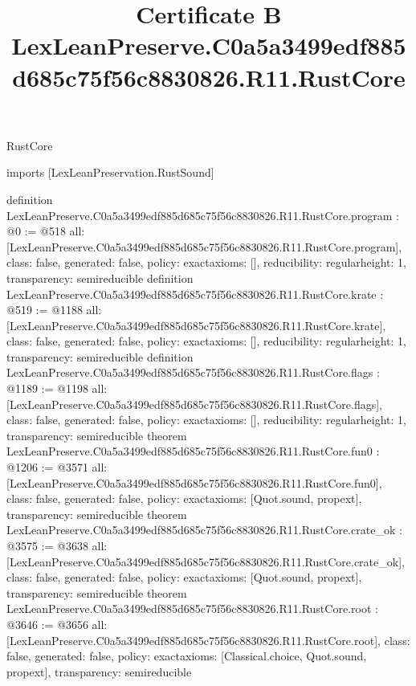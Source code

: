 \begin{lexlean}{RustCore}
\title{Certificate B LexLeanPreserve.C0a5a3499edf885d685c75f56c8830826.R11.RustCore}
\begin{coremodule}
imports [LexLeanPreservation.RustSound]

definition LexLeanPreserve.C0a5a3499edf885d685c75f56c8830826.R11.RustCore.program : @0 := @518 {
  all: [LexLeanPreserve.C0a5a3499edf885d685c75f56c8830826.R11.RustCore.program],
  class: false,
  generated: false,
  policy: exact{axioms: []},
  reducibility: regular{height: 1},
  transparency: semireducible
}
definition LexLeanPreserve.C0a5a3499edf885d685c75f56c8830826.R11.RustCore.krate : @519 := @1188 {
  all: [LexLeanPreserve.C0a5a3499edf885d685c75f56c8830826.R11.RustCore.krate],
  class: false,
  generated: false,
  policy: exact{axioms: []},
  reducibility: regular{height: 1},
  transparency: semireducible
}
definition LexLeanPreserve.C0a5a3499edf885d685c75f56c8830826.R11.RustCore.flags : @1189 := @1198 {
  all: [LexLeanPreserve.C0a5a3499edf885d685c75f56c8830826.R11.RustCore.flags],
  class: false,
  generated: false,
  policy: exact{axioms: []},
  reducibility: regular{height: 1},
  transparency: semireducible
}
theorem LexLeanPreserve.C0a5a3499edf885d685c75f56c8830826.R11.RustCore.fun0 : @1206 := @3571 {
  all: [LexLeanPreserve.C0a5a3499edf885d685c75f56c8830826.R11.RustCore.fun0],
  class: false,
  generated: false,
  policy: exact{axioms: [Quot.sound, propext]},
  transparency: semireducible
}
theorem LexLeanPreserve.C0a5a3499edf885d685c75f56c8830826.R11.RustCore.crate_ok : @3575 := @3638 {
  all: [LexLeanPreserve.C0a5a3499edf885d685c75f56c8830826.R11.RustCore.crate_ok],
  class: false,
  generated: false,
  policy: exact{axioms: [Quot.sound, propext]},
  transparency: semireducible
}
theorem LexLeanPreserve.C0a5a3499edf885d685c75f56c8830826.R11.RustCore.root : @3646 := @3656 {
  all: [LexLeanPreserve.C0a5a3499edf885d685c75f56c8830826.R11.RustCore.root],
  class: false,
  generated: false,
  policy: exact{axioms: [Classical.choice, Quot.sound, propext]},
  transparency: semireducible
}


\end{coremodule}
\end{lexlean}
